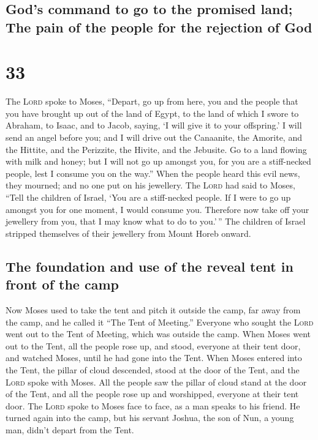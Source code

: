 \hypertarget{gods-command-to-go-to-the-promised-land-the-pain-of-the-people-for-the-rejection-of-god}{%
\subsection{God's command to go to the promised land; The pain of the
people for the rejection of
God}\label{gods-command-to-go-to-the-promised-land-the-pain-of-the-people-for-the-rejection-of-god}}

\hypertarget{section-32}{%
\section{33}\label{section-32}}

 The \textsc{Lord} spoke to Moses, ``Depart, go up from
here, you and the people that you have brought up out of the land of
Egypt, to the land of which I swore to Abraham, to Isaac, and to Jacob,
saying, `I will give it to your offspring.'  I will send
an angel before you; and I will drive out the Canaanite, the Amorite,
and the Hittite, and the Perizzite, the Hivite, and the Jebusite.
 Go to a land flowing with milk and honey; but I will not
go up amongst you, for you are a stiff-necked people, lest I consume you
on the way.''  When the people heard this evil news, they
mourned; and no one put on his jewellery.  The
\textsc{Lord} had said to Moses, ``Tell the children of Israel, `You are
a stiff-necked people. If I were to go up amongst you for one moment, I
would consume you. Therefore now take off your jewellery from you, that
I may know what to do to you.'\,''  The children of Israel
stripped themselves of their jewellery from Mount Horeb onward.

\hypertarget{the-foundation-and-use-of-the-reveal-tent-in-front-of-the-camp}{%
\subsection{The foundation and use of the reveal tent in front of the
camp}\label{the-foundation-and-use-of-the-reveal-tent-in-front-of-the-camp}}

 Now Moses used to take the tent and pitch it outside the
camp, far away from the camp, and he called it ``The Tent of Meeting.''
Everyone who sought the \textsc{Lord} went out to the Tent of Meeting,
which was outside the camp.  When Moses went out to the
Tent, all the people rose up, and stood, everyone at their tent door,
and watched Moses, until he had gone into the Tent.  When
Moses entered into the Tent, the pillar of cloud descended, stood at the
door of the Tent, and the \textsc{Lord} spoke with Moses.
 All the people saw the pillar of cloud stand at the door
of the Tent, and all the people rose up and worshipped, everyone at
their tent door.  The \textsc{Lord} spoke to Moses face
to face, as a man speaks to his friend. He turned again into the camp,
but his servant Joshua, the son of Nun, a young man, didn't depart from
the Tent.

